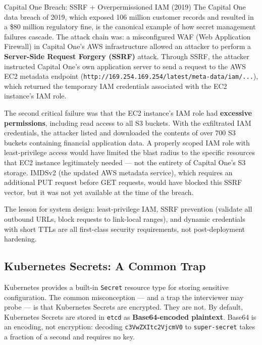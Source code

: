 \documentclass[11pt,a4paper]{article}
\begin{document}
\begin{industrybox}{Capital One Breach: SSRF + Overpermissioned IAM (2019)}
The Capital One data breach of 2019, which exposed 106 million customer records and resulted in a \$80 million regulatory fine, is the canonical example of how secret management failures cascade. The attack chain was: a misconfigured WAF (Web Application Firewall) in Capital One's AWS infrastructure allowed an attacker to perform a \textbf{Server-Side Request Forgery (SSRF)} attack. Through SSRF, the attacker instructed Capital One's own application server to send a request to the AWS EC2 metadata endpoint (\texttt{http://169.254.169.254/latest/meta-data/iam/...}), which returned the temporary IAM credentials associated with the EC2 instance's IAM role.

The second critical failure was that the EC2 instance's IAM role had \textbf{excessive permissions}, including read access to all S3 buckets. With the exfiltrated IAM credentials, the attacker listed and downloaded the contents of over 700 S3 buckets containing financial application data. A properly scoped IAM role with least-privilege access would have limited the blast radius to the specific resources that EC2 instance legitimately needed --- not the entirety of Capital One's S3 storage. IMDSv2 (the updated AWS metadata service), which requires an additional PUT request before GET requests, would have blocked this SSRF vector, but it was not yet available at the time of the breach.

The lesson for system design: least-privilege IAM, SSRF prevention (validate all outbound URLs, block requests to link-local ranges), and dynamic credentials with short TTLs are all first-class security requirements, not post-deployment hardening.
\end{industrybox}

\subsection{Kubernetes Secrets: A Common Trap}

Kubernetes provides a built-in \texttt{Secret} resource type for storing sensitive configuration. The common misconception --- and a trap the interviewer may probe --- is that Kubernetes Secrets are encrypted. They are not. By default, Kubernetes Secrets are stored in \texttt{etcd} as \textbf{Base64-encoded plaintext}. Base64 is an encoding, not encryption: decoding \texttt{c3VwZXItc2VjcmV0} to \texttt{super-secret} takes a fraction of a second and requires no key.
\end{document}
